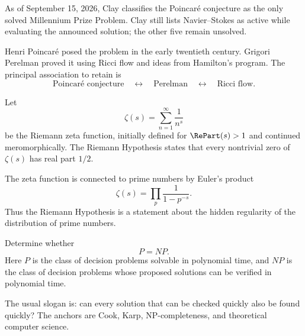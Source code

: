     \begin{fact}
        As of September 15, 2026, Clay classifies the Poincaré conjecture as the
        only solved Millennium Prize Problem. Clay still lists Navier--Stokes as
        active while evaluating the announced solution; the other five remain
        unsolved.
    \end{fact}

    \begin{remark}
        Henri Poincaré posed the problem in the early twentieth century. Grigori
        Perelman proved it using Ricci flow and ideas from Hamilton's program.
        The principal association to retain is
        \[
            \text{Poincaré conjecture}
            \quad\longleftrightarrow\quad
            \text{Perelman}
            \quad\longleftrightarrow\quad
            \text{Ricci flow}.
        \]
    \end{remark}

    \begin{hypothesis}
        Let
        \[
            \zeta(s)=\sum_{n=1}^{\infty}\frac{1}{n^s}
        \]
        be the Riemann zeta function, initially defined for $\RePart(s)>1$ and
        continued meromorphically. The Riemann Hypothesis states that every
        nontrivial zero of $\zeta(s)$ has real part $1/2$.
    \end{hypothesis}

    \begin{idea}
        The zeta function is connected to prime numbers by Euler's product
        \[
            \zeta(s)=\prod_{p}\frac{1}{1-p^{-s}}.
        \]
        Thus the Riemann Hypothesis is a statement about the hidden regularity
        of the distribution of prime numbers.
    \end{idea}

    \begin{openproblem}[P versus NP]
        Determine whether
        \[
            P=NP.
        \]
        Here $P$ is the class of decision problems solvable in polynomial time,
        and $NP$ is the class of decision problems whose proposed solutions can
        be verified in polynomial time.
    \end{openproblem}

    \begin{remark}
        The usual slogan is: can every solution that can be checked quickly also
        be found quickly? The anchors are Cook, Karp, NP-completeness, and
        theoretical computer science.
    \end{remark}

